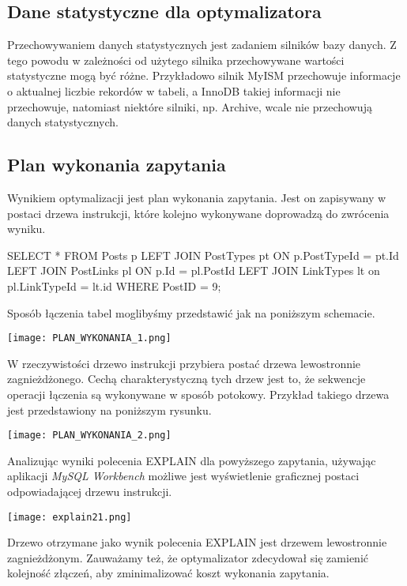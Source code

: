 \subsection{Dane statystyczne dla optymalizatora}
Przechowywaniem danych statystycznych jest zadaniem silników bazy danych. Z tego powodu w zależności od użytego silnika przechowywane wartości statystyczne mogą być różne. Przykładowo silnik MyISM przechowuje informacje o aktualnej liczbie rekordów w tabeli, a InnoDB takiej informacji nie przechowuje, natomiast niektóre silniki, np. Archive, wcale nie przechowują danych statystycznych.

\subsection{Plan wykonania zapytania}
Wynikiem optymalizacji jest plan wykonania zapytania. Jest on zapisywany w postaci drzewa instrukcji, które kolejno wykonywane doprowadzą do zwrócenia wyniku.
\begin{spverbatim}
	SELECT * FROM Posts p LEFT JOIN PostTypes pt ON p.PostTypeId = pt.Id LEFT JOIN PostLinks pl ON p.Id = pl.PostId LEFT JOIN LinkTypes lt on pl.LinkTypeId = lt.id WHERE PostID = 9;
\end{spverbatim}
Sposób łączenia tabel moglibyśmy przedstawić jak na poniższym schemacie.
 \begin{center}
 	\texttt{[image: PLAN\_WYKONANIA\_1.png]} 
 \end{center}
W rzeczywistości drzewo instrukcji przybiera postać drzewa lewostronnie zagnieżdżonego. Cechą charakterystyczną tych drzew jest to, że sekwencje operacji łączenia są wykonywane w sposób potokowy. Przykład takiego drzewa jest przedstawiony na poniższym rysunku.
\begin{center}
	\texttt{[image: PLAN\_WYKONANIA\_2.png]} 
\end{center}
Analizując wyniki polecenia EXPLAIN dla powyższego zapytania, używając aplikacji \textit{MySQL Workbench} możliwe jest wyświetlenie graficznej postaci odpowiadającej drzewu instrukcji.
\begin{center}
	\texttt{[image: explain21.png]} 
\end{center}
Drzewo otrzymane jako wynik polecenia EXPLAIN jest drzewem lewostronnie zagnieżdżonym. Zauważamy też, że optymalizator zdecydował się zamienić kolejność złączeń, aby zminimalizować koszt wykonania zapytania.

